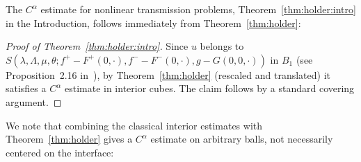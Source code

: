 \documentclass[letter,11pt]{amsart}
\theoremstyle{definition}
\numberwithin{equation}{section}
\begin{document}
\medskip

The $C^{\alpha}$ estimate for nonlinear transmission problems, Theorem~\ref{thm:holder:intro} in the Introduction, follows immediately from Theorem~\ref{thm:holder}:
\begin{proof}[Proof of Theorem~\ref{thm:holder:intro}]
Since $u$ belongs to $S(\lambda, \Lambda, \mu, \theta; f^{+} - F^{+}(0,\cdot), f^{-} - F^{-}(0,\cdot), g - G(0,0,\cdot))$ in $B_1$ (see Proposition~2.16 in~\cite{E}), by Theorem~\ref{thm:holder} (rescaled and translated) it satisfies a $C^{\alpha}$ estimate in interior cubes.
The claim follows by a standard covering argument.
\end{proof}

\medskip

We note that combining the classical interior estimates with Theorem~\ref{thm:holder} gives a $C^{\alpha}$ estimate on arbitrary balls, not necessarily centered on the interface:
\end{document}
